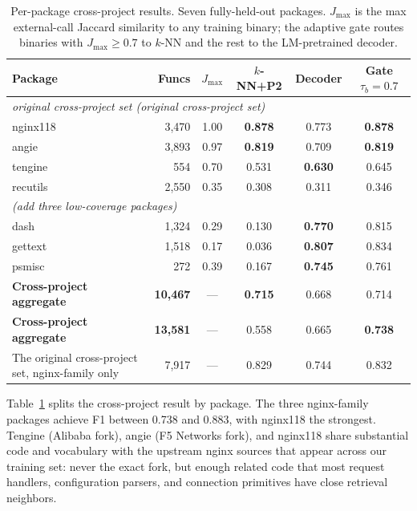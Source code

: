 \documentclass[sigconf,nonacm]{acmart}
\begin{document}
\begin{table}[t]
    \centering
    \caption{Per-package cross-project results. Seven fully-held-out packages. $J_{\max}$ is the max external-call Jaccard similarity to any training binary; the adaptive gate routes binaries with $J_{\max}\!\ge\!0.7$ to $k$-NN and the rest to the LM-pretrained decoder.}
    \label{tab:perpackage}
    \footnotesize
    \begin{tabular}{lrcccc}
        \toprule
        \textbf{Package} & \textbf{Funcs} & \boldmath$J_{\max}$ & \textbf{$k$-NN+P2} & \textbf{Decoder} & \textbf{Gate $\tau_b\!=\!0.7$} \\
        \midrule
        \multicolumn{6}{l}{\emph{original cross-project set (original cross-project set)}} \\
        nginx118 & 3{,}470 & 1.00 & \textbf{0.878} & 0.773 & \textbf{0.878} \\
        angie    & 3{,}893 & 0.97 & \textbf{0.819} & 0.709 & \textbf{0.819} \\
        tengine  &   554  & 0.70 & 0.531          & \textbf{0.630} & 0.645 \\
        recutils & 2{,}550 & 0.35 & 0.308         & 0.311 & 0.346 \\
        \midrule
        \multicolumn{6}{l}{\emph{ (add three low-coverage packages)}} \\
        dash     & 1{,}324 & 0.29 & 0.130          & \textbf{0.770} & 0.815 \\
        gettext  & 1{,}518 & 0.17 & 0.036          & \textbf{0.807} & 0.834 \\
        psmisc   &    272 & 0.39 & 0.167          & \textbf{0.745} & 0.761 \\
        \midrule
        \textbf{Cross-project aggregate} & \textbf{10{,}467} & --- & \textbf{0.715} & 0.668 & 0.714 \\
        \textbf{Cross-project aggregate} & \textbf{13{,}581} & --- & 0.558 & 0.665 & \textbf{0.738} \\
        The original cross-project set, nginx-family only & 7{,}917 & --- & 0.829 & 0.744 & 0.832 \\
        \bottomrule
    \end{tabular}
\end{table}

Table~\ref{tab:perpackage} splits the cross-project result by package. The three nginx-family packages achieve F1 between 0.738 and 0.883, with nginx118 the strongest. Tengine (Alibaba fork), angie (F5 Networks fork), and nginx118 share substantial code and vocabulary with the upstream nginx sources that appear across our training set: never the exact fork, but enough related code that most request handlers, configuration parsers, and connection primitives have close retrieval neighbors.
\end{document}
